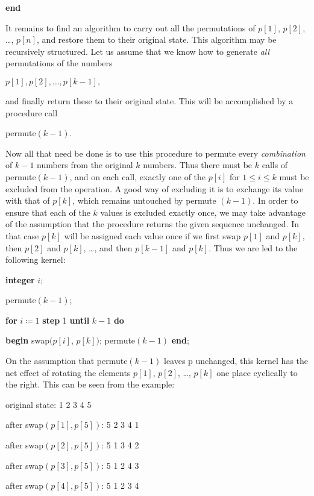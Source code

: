 \quad \quad \textbf{end}

It remains to find an algorithm to carry out all the permutations of $p[1]$, $p[2]$, \dots, $p[n]$, and restore them to their original state. This algorithm may be recursively structured. Let us assume that we know how to generate \textit{all} permutations of the numbers

\quad $p[1], p[2], \dots, p[k - 1],$

\noindent
and finally return these to their original state. This will be accomplished by a procedure call

\quad permute$(k - 1)$.

\noindent
Now all that need be done is to use this procedure to permute every \textit{combination} of $k - 1$ numbers from the original $k$ numbers. Thus there must be $k$ calls of permute$(k - 1)$, and on each call, exactly one of the $p[i]$ for $1 \leqslant i \leqslant k$ must be excluded from the operation. A good way of excluding it is to exchange its value with that of $p[k]$, which remains untouched by permute $(k - 1)$. In order to ensure that each of the $k$ values is excluded exactly once, we may take advantage of the assumption that the procedure returns the given sequence unchanged. In that case $p[k]$ will be assigned each value once if we first swap $p[1]$ and $p[k]$, then $p[2]$ and $p[k]$, \dots, and then $p[k - 1]$ and $p[k]$. Thus we are led to the following kernel:

\quad \textbf{integer} $i$;

\quad permute$(k - 1)$;

\quad \textbf{for} $i\coloneq 1$ \textbf{step} 1 \textbf{until} $k - 1$ \textbf{do}

\quad \quad \textbf{begin} swap$(p[i]$, $p[k])$; permute$(k - 1)$ \textbf{end};

\noindent
On the assumption that permute$(k - 1)$ leaves p unchanged, this kernel has the net effect of rotating the elements $p[1]$, $p[2]$, \dots, $p[k]$ one place cyclically to the right. This can be seen from the example:

\quad original state:\tabto*{12em}  1 2 3 4 5

\quad after swap$(p[1], p[5])$:\tabto*{12em} 5 2 3 4 1

\quad after swap$(p[2], p[5])$:\tabto*{12em}  5 1 3 4 2

\quad after swap$(p[3], p[5])$:\tabto*{12em}  5 1 2 4 3

\quad after swap$(p[4], p[5])$:\tabto*{12em}  5 1 2 3 4


